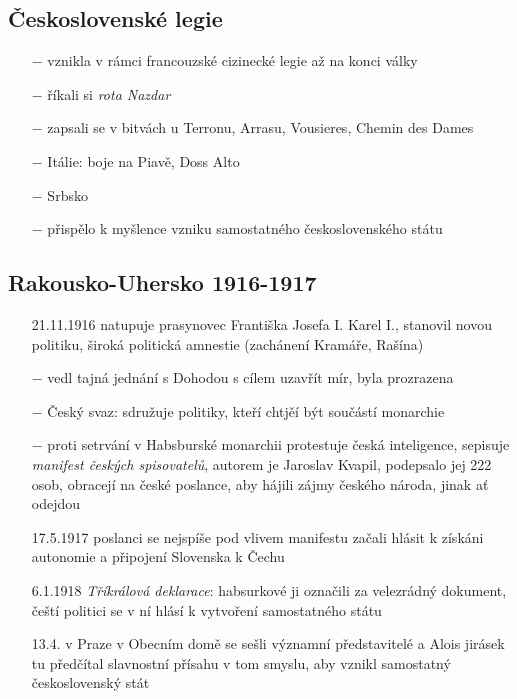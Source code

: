 \documentclass{article}
\begin{document}
\subsection*{Československé legie}
\begin{itemize}
    \vspace{-0.5em}
    \setlength\itemsep{0.15em}
    \item[$-$] vznikla v rámci francouzské cizinecké legie až na konci války
    \item[$-$] říkali si \textit{rota Nazdar}
    \item[$-$] zapsali se v bitvách u Terronu, Arrasu, Vousieres, Chemin des Dames
    \item[$-$] Itálie: boje na Piavě, Doss Alto
    \item[$-$] Srbsko
    \item[$-$] přispělo k myšlence vzniku samostatného československého státu
\end{itemize}

\subsection*{Rakousko-Uhersko 1916-1917}
\begin{itemize}
    \vspace{-0.5em}
    \setlength\itemsep{0.15em}
    \item[21.11.1916] natupuje prasynovec Františka Josefa I. Karel I., stanovil novou politiku, široká politická amnestie (zachánení Kramáře, Rašína)
    \item[$-$] vedl tajná jednání s Dohodou s cílem uzavřít mír, byla prozrazena
    \item[$-$] Český svaz: sdružuje politiky, kteří chtjěí být součástí monarchie
    \item[$-$] proti setrvání v Habsburské monarchii protestuje česká inteligence, sepisuje \textit{manifest českých spisovatelů}, autorem je Jaroslav Kvapil, podepsalo jej 222 osob, obracejí na české poslance, aby hájili zájmy českého národa, jinak ať odejdou
    \item[17.5.1917] poslanci se nejspíše pod vlivem manifestu začali hlásit k získáni autonomie a připojení Slovenska k Čechu
    \item[6.1.1918] \textit{Tříkrálová deklarace}: habsurkové ji označili za velezrádný dokument, čeští politici se v ní hlásí k vytvoření samostatného státu
    \item[13.4.] v Praze v Obecním domě se sešli významní představitelé a Alois jirásek tu předčítal slavnostní přísahu v tom smyslu, aby vznikl samostatný československý stát
\end{itemize}
\end{document}
